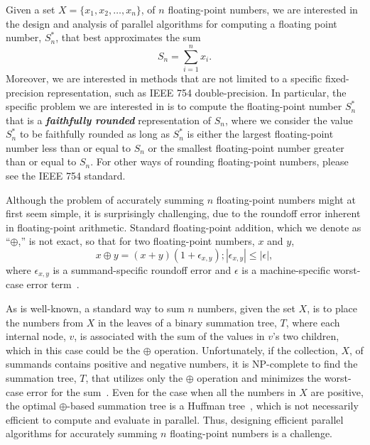 \documentclass[11pt]{article}
\renewcommand{\emph}[1]{\textit{\textbf{#1}}}
\begin{document}
Given a set $X=\{x_1,x_2,\ldots,x_n\}$, of $n$ floating-point
numbers,
we are interested in the design and analysis of 
parallel algorithms for computing a floating point number, $S_n^*$,
that best approximates the sum
\[
S_n = \sum_{i=1}^n x_i.
\]
Moreover, we are interested in methods that are not limited
to a specific fixed-precision representation, such as IEEE 754 
double-precision.
In particular,
the specific problem we are interested in is to
compute the floating-point number $S_n^*$ that is a 
\emph{faithfully rounded}
representation of $S_n$, where
we consider the value $S_n^*$ to be faithfully rounded as long as
$S_n^*$ is either the largest floating-point number less than or
equal to $S_n$ or the smallest floating-point number greater than or
equal to $S_n$.
For other ways of rounding floating-point numbers,
please see the IEEE 754 standard.

Although the problem of accurately summing $n$ floating-point numbers
might at first seem simple, it is
surprisingly challenging, due to the roundoff error inherent
in floating-point arithmetic.
Standard floating-point addition, which we denote as ``$\oplus$,'' is
not exact, so that for two floating-point numbers, $x$ and $y$,
\[
x \oplus y = (x+y)(1+\epsilon_{x,y}); |\epsilon_{x,y}| \le |\epsilon|,
\]
where $\epsilon_{x,y}$ is a summand-specific roundoff error
and $\epsilon$ is a machine-specific worst-case 
error term~\cite{Knuth:1997:ACP:270146,doi:10.1137/S0097539798341594}.

As is well-known,
a standard way to sum $n$ numbers, given the set $X$,
is to place the numbers from $X$ in the
leaves of a binary summation tree, $T$, where each internal node, $v$, is
associated with the sum of the values in $v$'s two children,
which in this case could be the $\oplus$ operation.
Unfortunately, if the collection, $X$, of summands contains positive and
negative numbers, it is NP-complete to find the summation tree, $T$,
that utilizes only the $\oplus$ operation
and minimizes the worst-case error for the
sum~\cite{doi:10.1137/S0097539798341594}.
Even for the case when
all the numbers in $X$ are positive, the optimal $\oplus$-based summation
tree is a Huffman tree~\cite{doi:10.1137/S0097539798341594}, 
which is not necessarily efficient to compute
and evaluate in parallel.
Thus, designing efficient parallel algorithms for accurately summing $n$
floating-point numbers is a challenge.
\end{document}
